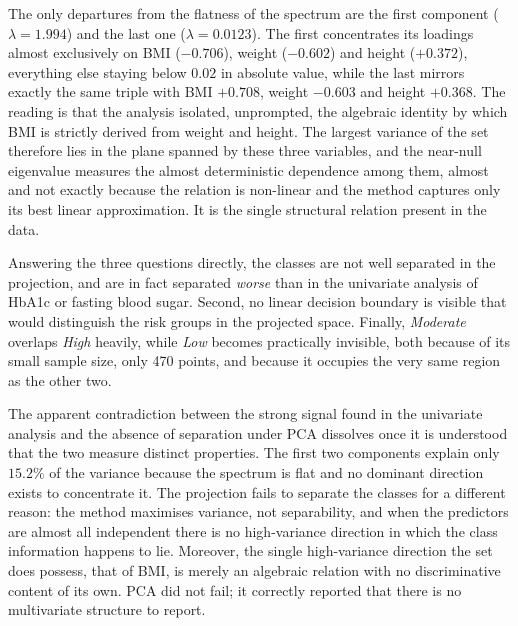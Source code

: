 \documentclass[conference]{IEEEtran}
\begin{document}
The only departures from the flatness of the spectrum are the first
component ($\lambda = 1.994$) and the last one ($\lambda = 0.0123$).
The first concentrates its loadings almost exclusively on BMI
($-0.706$), weight ($-0.602$) and height ($+0.372$), everything else
staying below $0.02$ in absolute value, while the last mirrors exactly
the same triple with BMI $+0.708$, weight $-0.603$ and height
$+0.368$. The reading is that the analysis isolated, unprompted, the
algebraic identity by which BMI is strictly derived from weight and
height. The largest variance of the set therefore lies in the plane
spanned by these three variables, and the near-null eigenvalue
measures the almost deterministic dependence among them, almost and
not exactly because the relation is non-linear and the method captures
only its best linear approximation. It is the single structural
relation present in the data.

Answering the three questions directly, the classes are not well
separated in the projection, and are in fact separated \emph{worse}
than in the univariate analysis of HbA1c or fasting blood sugar.
Second, no linear decision boundary is visible that would distinguish
the risk groups in the projected space. Finally, \emph{Moderate}
overlaps \emph{High} heavily, while \emph{Low} becomes practically
invisible, both because of its small sample size, only 470 points, and
because it occupies the very same region as the other two.

The apparent contradiction between the strong signal found in the
univariate analysis and the absence of separation under PCA dissolves
once it is understood that the two measure distinct properties. The
first two components explain only $15.2\%$ of the variance because the
spectrum is flat and no dominant direction exists to concentrate it.
The projection fails to separate the classes for a different reason:
the method maximises variance, not separability, and when the
predictors are almost all independent there is no high-variance
direction in which the class information happens to lie. Moreover, the
single high-variance direction the set does possess, that of BMI, is
merely an algebraic relation with no discriminative content of its
own. PCA did not fail; it correctly reported that there is no
multivariate structure to report.

\end{document}
